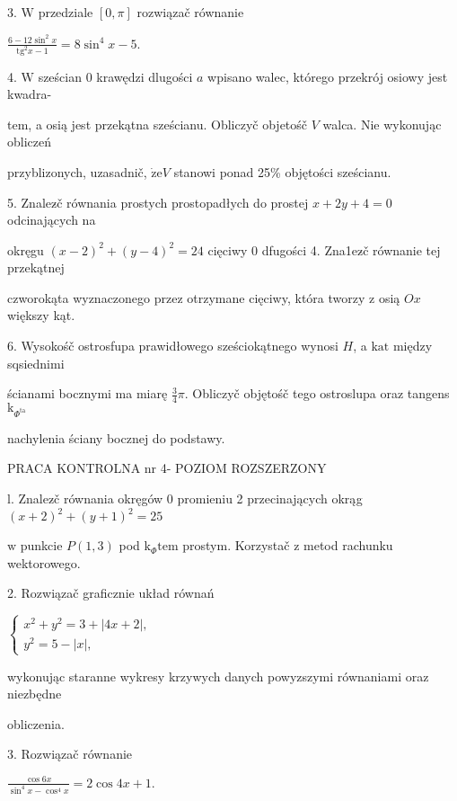 \documentclass[a4paper,12pt]{article}
\begin{document}
3. $\mathrm{W}$ przedziale $[0,\pi]$ rozwiązač równanie

$\displaystyle \frac{6-12\sin^{2}x}{\mathrm{t}\mathrm{g}^{2}x-1}=8\sin^{4}x-5.$

4. $\mathrm{W}$ sześcian $0$ krawędzi dlugości $a$ wpisano walec, którego przekrój osiowy jest kwadra-

tem, a osią jest przekątna sześcianu. Obliczyč objetośč $V$ walca. Nie wykonując obliczeń

przyblizonych, uzasadnič, $\dot{\mathrm{z}}\mathrm{e}V$ stanowi ponad 25\% objętości sześcianu.

5. Znalez$\acute{}$č równania prostych prostopadłych do prostej $x+2y+4 = 0$ odcinających na

okręgu $(x-2)^{2}+(y-4)^{2} =24$ cięciwy $0$ dfugości 4. Zna1ez$\acute{}$č równanie tej przekątnej

czworokąta wyznaczonego przez otrzymane cięciwy, która tworzy $\mathrm{z}$ osią $Ox$ większy kąt.

6. Wysokośč ostrosfupa prawidłowego sześciokątnego wynosi $H$, a $\mathrm{k}\mathrm{a}\mathrm{t}$ między sqsiednimi

ścianami bocznymi ma miarę $\displaystyle \frac{3}{4}\pi$. Obliczyč objętośč tego ostroslupa oraz tangens $\mathrm{k}_{\Phi^{\mathrm{t}\mathrm{a}}}$

nachylenia ściany bocznej do podstawy.





PRACA KONTROLNA nr 4- POZIOM ROZSZERZONY

l. Znalez$\acute{}$č równania okręgów $0$ promieniu 2 przecinających okrąg $(x+2)^{2}+(y+1)^{2}=25$

$\mathrm{w}$ punkcie $P(1,3)$ pod $\mathrm{k}_{\Phi}\mathrm{t}\mathrm{e}\mathrm{m}$ prostym. Korzystač $\mathrm{z}$ metod rachunku wektorowego.

2. Rozwiązač graficznie układ równań

$\left\{\begin{array}{l}
x^{2}+y^{2}=3+|4x+2|,\\
y^{2}=5-|x|,
\end{array}\right.$

wykonując staranne wykresy krzywych danych powyzszymi równaniami oraz niezbędne

obliczenia.

3. Rozwiązač równanie

$\displaystyle \frac{\cos 6x}{\sin^{4}x-\cos^{4}x}=2\cos 4x+1.$
\end{document}
